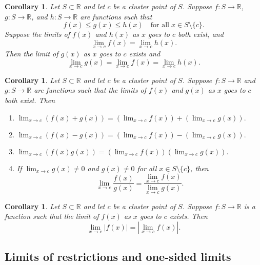 \documentclass{article}
\newtheorem{corollary}[theorem]{Corollary}
\theoremstyle{definition}
\begin{document}
\begin{corollary}
    Let \( S \subset \mathbb{R} \) and let \( c \) be a cluster point of \( S \). Suppose \( f: S \rightarrow \mathbb{R} \), \( g: S \rightarrow \mathbb{R} \), and \( h: S \rightarrow \mathbb{R} \) are functions such that
\[ f(x) \leq g(x) \leq h(x) \quad \text{for all} \; x \in S \setminus \{c\}. \]
Suppose the limits of \( f(x) \) and \( h(x) \) as \( x \) goes to \( c \) both exist, and
\[ \lim_{x \to c} f(x) = \lim_{x \to c} h(x). \]
Then the limit of \( g(x) \) as \( x \) goes to \( c \) exists and
\[ \lim_{x \to c} g(x) = \lim_{x \to c} f(x) = \lim_{x \to c} h(x). \]
\end{corollary}

\begin{corollary}
    Let \( S \subset \mathbb{R} \) and let \( c \) be a cluster point of \( S \). Suppose \( f: S \rightarrow \mathbb{R} \) and \( g: S \rightarrow \mathbb{R} \) are functions such that the limits of \( f(x) \) and \( g(x) \) as \( x \) goes to \( c \) both exist. Then

\begin{enumerate}[label=(\roman*)]
    \item \(\lim_{x \to c} (f(x) + g(x)) = \left( \lim_{x \to c} f(x) \right) + \left( \lim_{x \to c} g(x) \right).\)
    \item \(\lim_{x \to c} (f(x) - g(x)) = \left( \lim_{x \to c} f(x) \right) - \left( \lim_{x \to c} g(x) \right).\)
    \item \(\lim_{x \to c} (f(x) g(x)) = \left( \lim_{x \to c} f(x) \right) \left( \lim_{x \to c} g(x) \right).\)
    \item If \(\lim_{x \to c} g(x) \neq 0\) and \( g(x) \neq 0 \) for all \( x \in S \setminus \{c\} \), then
    \[ \lim_{x \to c} \frac{f(x)}{g(x)} = \frac{\lim_{x \to c} f(x)}{\lim_{x \to c} g(x)}. \]
\end{enumerate}
\end{corollary}

\begin{corollary}
    Let \( S \subset \mathbb{R} \) and let \( c \) be a cluster point of \( S \). Suppose \( f: S \rightarrow \mathbb{R} \) is a function such that the limit of \( f(x) \) as \( x \) goes to \( c \) exists. Then
\[ \lim_{x \to c} |f(x)| = \left| \lim_{x \to c} f(x) \right|. \]

\end{corollary}


\subsection{Limits of restrictions and one-sided limits}
\end{document}
